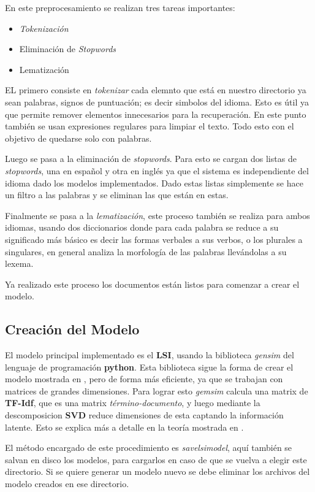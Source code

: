 \documentclass{llncs}
\begin{document}
    En este preprocesamiento se realizan tres tareas importantes:
    \begin{itemize}
    	\item \emph{Tokenización}
    	\item Eliminación de \emph{Stopwords}
    	\item Lematización
    \end{itemize}

    EL primero consiste en \emph{tokenizar} cada elemnto que está en nuestro directorio ya sean palabras, signos de puntuación; es decir simbolos del idioma. Esto es útil ya que permite remover elementos innecesarios para la recuperación. En este punto también se usan expresiones regulares para limpiar el texto. Todo esto con el objetivo de quedarse solo con palabras.

    Luego se pasa a la eliminación de \emph{stopwords}. Para esto se cargan dos listas de \emph{stopwords}, una en español y otra en inglés ya que el sistema es independiente del idioma dado los modelos implementados. Dado estas listas simplemente se hace un filtro a las palabras y se eliminan las que están en estas.

    Finalmente se pasa a la \emph{lematización}, este proceso también se realiza para ambos idiomas, usando dos diccionarios donde para cada palabra se reduce a su significado más básico es decir las formas verbales a sus verbos, o los plurales a singulares, en general analiza la morfología de las palabras llevándolas a su lexema.

    Ya realizado este proceso los documentos están listos para comenzar a crear el modelo.

  \subsection{Creación del Modelo}

    El modelo principal implementado es el \textbf{LSI}, usando la biblioteca \emph{gensim} del lenguaje de programación \textbf{python}. Esta biblioteca sigue la forma de crear el modelo mostrada en \cite{Jose}, pero de forma más eficiente, ya que se trabajan con matrices de grandes dimensiones. Para lograr esto \emph{gemsim} calcula una matrix de \textbf{TF-Idf}, que es una matrix \emph{término-documento}, y luego mediante la descomposicion \textbf{SVD} reduce dimensiones de esta captando la información latente. Esto se explica más a detalle en la teoría mostrada en \cite{Daniel,Jose}.

    El método encargado de este procedimiento es \emph{savelsimodel}, aquí también se salvan en disco los modelos, para cargarlos en caso de que se vuelva a elegir este directorio. Si se quiere generar un modelo nuevo se debe eliminar los archivos del modelo creados en ese directorio.
\end{document}
